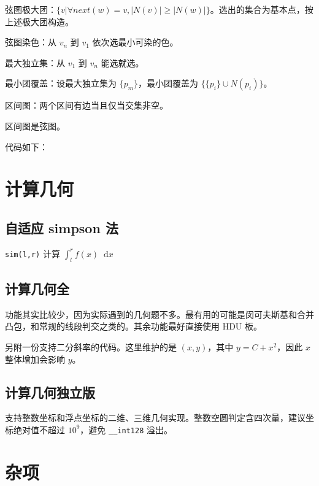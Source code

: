 \documentclass[12pt]{ctexart}
\newcommand*{\dif}{\mathop{}\!\mathrm{d}}
\begin{document}
弦图极大团：$\{v|\forall next(w)=v,|N(v)|\ge |N(w)|\}$。选出的集合为基本点，按上述极大团构造。

弦图染色：从 $v_n$ 到 $v_1$ 依次选最小可染的色。

最大独立集：从 $v_1$ 到 $v_n$ 能选就选。

最小团覆盖：设最大独立集为 $\{p_m\}$，最小团覆盖为 $\{\{p_i\}\cup N(p_i)\}$。

区间图：两个区间有边当且仅当交集非空。

区间图是弦图。

代码如下：






\newpage

\section{计算几何}

\subsection{自适应 simpson 法}

\verb|sim(l,r)| 计算 $\int_l^r f(x)\dif x$



\subsection{计算几何全}

功能其实比较少，因为实际遇到的几何题不多。最有用的可能是闵可夫斯基和合并凸包，和常规的线段判交之类的。其余功能最好直接使用 HDU 板。



另附一份支持二分斜率的代码。这里维护的是 $(x,y)$，其中 $y=C+x^2$，因此 $x$ 整体增加会影响 $y$。


\subsection{计算几何独立版}

支持整数坐标和浮点坐标的二维、三维几何实现。整数空圆判定含四次量，建议坐标绝对值不超过 $10^9$，避免 \verb|__int128| 溢出。


\newpage

\section{杂项}
\end{document}
